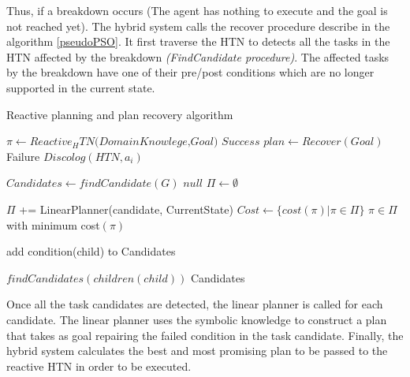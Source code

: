 \documentclass[conference]{IEEEtran}
\begin{document}
	\par Thus, if a breakdown occurs (The agent has nothing to execute and the goal is not reached yet). The hybrid system calls the recover procedure describe in the algorithm \ref{pseudoPSO}. It first traverse the HTN to detects all the tasks in the HTN affected by the breakdown \emph{(FindCandidate procedure)}. The affected tasks by the breakdown have one of their pre/post conditions which are no longer supported in the current state.
	\begin{algorithm}
	\caption{ Reactive planning and plan recovery algorithm}
	\label{pseudoPSO}
	\begin{algorithmic}[1]
					\State $\pi \gets Reactive_HTN \textit{(DomainKnowlege,Goal)}$
					\State \Return $\textit{Success} $
					\Else 
					\State$ plan \gets Recover(Goal)$
					\State \Return Failure
					\Else 
					\State  $\textit{Discolog} (HTN,a_i) $
					\EndFor
					\EndIf
					\EndIf

					\EndProcedure 



					\State $\textit{Candidates}\gets\textit{findCandidate}{(G)} $
					\State \Return $\textit{null} $
					\Else 
					\State $\Pi \gets \emptyset$
					
					\State $\Pi$ += LinearPlanner(candidate, CurrentState)
					\State  $Cost \gets \{ cost(\pi) | \pi \in  \Pi \} $
					\EndFor
					\EndIf
					\State \Return $\pi \in \Pi$  with minimum cost$(\pi)$

					\EndProcedure
					

					
					\State   add condition(child) to Candidates
					\EndIf
				
					\State $\textit{findCandidates} (children(child))$
					\EndFor
					\State \Return Candidates
	
					\EndProcedure 
	\end{algorithmic}
	\end{algorithm}
	 Once all the task candidates are detected, the linear planner is called for each candidate. The linear planner uses the symbolic knowledge to  construct a plan that takes as goal repairing the failed condition in the task candidate. Finally, the hybrid system calculates the best and most promising  plan to be passed to the reactive HTN in order to be executed. 
	 
\end{document}
